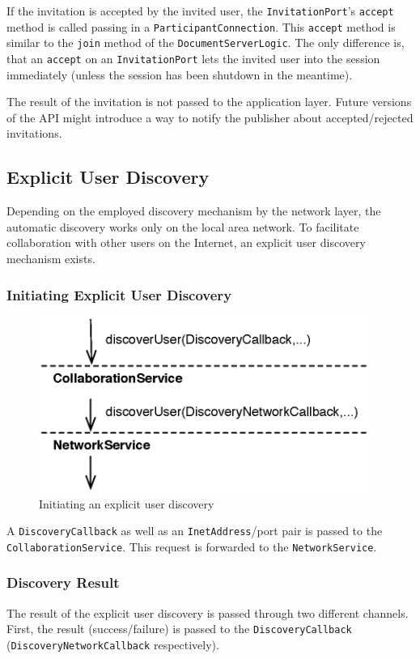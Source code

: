 If the invitation is accepted by the invited user, the \texttt{InvitationPort}'s 
\texttt{accept} method is called passing in a \texttt{ParticipantConnection}.
This \texttt{accept} method is similar to the \texttt{join} method
of the \texttt{DocumentServerLogic}. The only difference is, that an
\texttt{accept} on an \texttt{InvitationPort} lets the invited user into
the session immediately (unless the session has been shutdown in the meantime).

The result of the invitation is not passed to the application layer. Future
versions of the API might introduce a way to notify the publisher about
accepted/rejected invitations.


\subsection{Explicit User Discovery}
Depending on the employed discovery mechanism by the network layer, the
automatic discovery works only on the local area network. To facilitate
collaboration with other users on the Internet, an explicit user discovery
mechanism exists. 

\subsubsection{Initiating Explicit User Discovery}
\begin{figure}[H]
 \centering
 \includegraphics[width=10.80cm,height=5.72cm]{../images/finalreport/architecture_flows/explicitdiscovery.eps}
 \caption{Initiating an explicit user discovery}
 \label{fig:archoverview.flow.explicitdiscovery}
\end{figure}

A \texttt{DiscoveryCallback} as well as an \texttt{InetAddress}/port pair 
is passed to the \texttt{CollaborationService}. This request is forwarded
to the \texttt{NetworkService}.

\subsubsection{Discovery Result}
The result of the explicit user discovery is passed through two different
channels. First, the result (success/failure) is passed to the
\texttt{DiscoveryCallback} (\texttt{DiscoveryNetworkCallback}
respectively).

